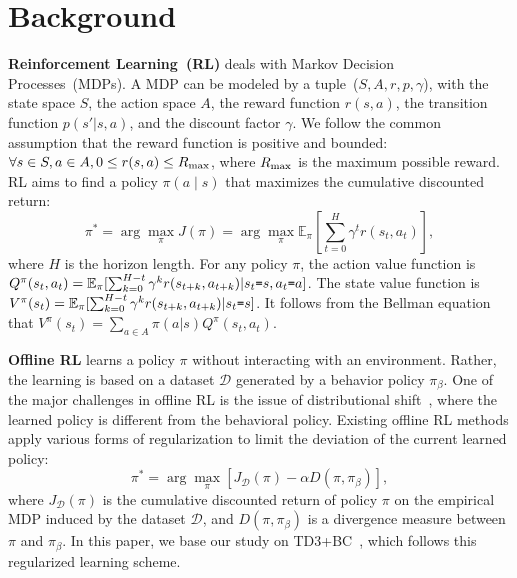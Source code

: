 \section{Background}\label{sec: preliminary}
\textbf{Reinforcement Learning~(RL)} deals with Markov Decision Processes~(MDPs). A MDP can be modeled by a tuple~($S, A, r, p, \gamma$), with the state space $S$, the action space $A$, the reward function $r(s, a)$, the transition function $p(s'|s,a)$, and the discount factor $\gamma$.
We follow the common assumption that the reward function is positive and bounded: $\forall s \in S, a\in A, 0\leq r(s,a) \leq R_{\rm max}$, where $R_{\rm max}$ is the maximum possible reward. RL aims to find a policy $\pi(a\mid s)$ that maximizes the cumulative discounted return:
\begin{equation}
    \pi^* = \arg\max_{\pi} J(\pi) = \arg\max_{\pi}\mathbb{E}_{\pi}[\sum_{t=0}^{H}\gamma^t r(s_t, a_t)],
\end{equation}
where $H$ is the horizon length.
For any policy $\pi$, the action value function is $Q^{\pi}(s_t,a_t)=\mathbb{E}_{\pi}[\sum_{k=0}^{H-t}\gamma^k r(s_{t+k}, a_{t+k})| s_t\textup{\texttt{=}} s, a_t\textup{\texttt{=}} a]$.
The state value function is $V^{\pi}(s_t)=\mathbb{E}_{\pi}[\sum_{k=0}^{H-t}\gamma^k r(s_{t+k}, a_{t+k})| s_t\textup{\texttt{=}} s]$.
It follows from the Bellman equation that $V^{\pi}(s_t) = \sum_{a\in A}\pi(a|s)Q^{\pi}(s_t,a_t)$.


\textbf{Offline RL} learns a policy $\pi$ without interacting with an environment. Rather, the learning is based on a dataset $\mathcal{D}$ generated by a behavior policy $\pi_{\beta}$. One of the major challenges in offline RL is the issue of distributional shift~\citep{fujimoto2019off}, where the learned policy is different from the behavioral policy. Existing offline RL methods apply various forms of regularization to limit the deviation of the current learned policy:
\begin{equation}
    \pi^* = \arg\max_{\pi}\left[ J_{\mathcal{D}}(\pi) - \alpha D(\pi, \pi_{\beta})\right],
    \label{eq: offline opt}
\end{equation}
where $J_{\mathcal{D}}(\pi)$ is the cumulative discounted return of policy $\pi$ on the empirical MDP induced by the dataset $\mathcal{D}$, and $D(\pi, \pi_{\beta})$ is a divergence measure between $\pi$ and $\pi_{\beta}$. In this paper, we base our study on TD3+BC~\citep{fujimoto2021minimalist}, which follows this regularized learning scheme.


